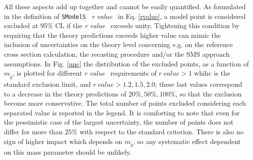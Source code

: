 \documentclass[a4paper,11pt]{article}
\newcommand{\SMO}{\texttt{SModelS\xspace}}
\newcommand{\MGLU}{$ m _{ \tilde g } $\xspace}
\newcommand{\RVALUE}{\textit{r value}}
\begin{document}
 All these aspects add up together and cannot be easily quantified. As formulated in the definition of \SMO~ \RVALUE~ in Eq. \ref{rvalue}, a model point is considered excluded at $95\%$ CL if the \RVALUE~ exceeds unity. Tightening this condition by requiring that the theory predictions exceeds higher value can mimic the inclusion of uncertainties on the theory level concerning e.g. on the reference cross section calculation, the recasting procedure and/or the SMS approach assumptions. 
In Fig. \ref{unc} the distribution of the excluded points, as a function of \MGLU, is plotted for different \RVALUE~ requirements of $r\ value >1$ whihc is the standard exclusion limit, and $r\ value >1.2 , 1.5,2.0$; these last values correspond to a decrease in the theory predictions of $20\%,50\%,100\%$, so that the exclusion become more conservative. The total number of points excluded considering each separated value is reported in the legend. It is comforting to note that even for the pessimistic case of the largest uncertainty, the number of points does not differ for more than $25\%$ with respect to the standard criterion. There is also no sign of higher impact which depends on \MGLU, so any systematic effect dependent on this mass parameter should be unlikely. 
%
\end{document}
